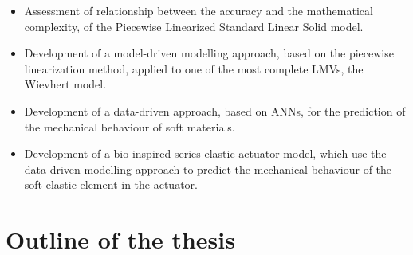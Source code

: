 \begin{itemize}
    \item Assessment of relationship between the accuracy and the mathematical complexity, of the Piecewise Linearized Standard Linear Solid model.
    \item Development of a model-driven modelling approach, based on the piecewise linearization method, applied to one of the most complete LMVs, the Wievhert model.
    \item Development of a data-driven approach, based on ANNs, for the prediction of the mechanical behaviour of soft materials.
    \item Development of a bio-inspired series-elastic actuator model, which use the data-driven modelling approach to predict the mechanical behaviour of the soft elastic element in the actuator.
\end{itemize}

\section{Outline of the thesis}

